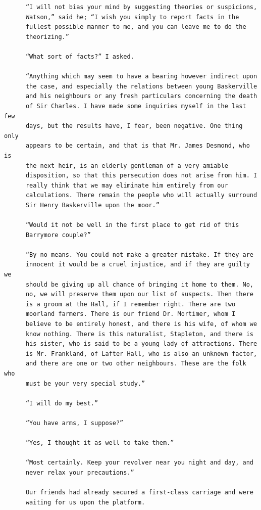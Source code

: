 \documentclass{article}
\begin{document}
\begin{verbatim}
      “I will not bias your mind by suggesting theories or suspicions,
      Watson,” said he; “I wish you simply to report facts in the
      fullest possible manner to me, and you can leave me to do the
      theorizing.”

      “What sort of facts?” I asked.

      “Anything which may seem to have a bearing however indirect upon
      the case, and especially the relations between young Baskerville
      and his neighbours or any fresh particulars concerning the death
      of Sir Charles. I have made some inquiries myself in the last few
      days, but the results have, I fear, been negative. One thing only
      appears to be certain, and that is that Mr. James Desmond, who is
      the next heir, is an elderly gentleman of a very amiable
      disposition, so that this persecution does not arise from him. I
      really think that we may eliminate him entirely from our
      calculations. There remain the people who will actually surround
      Sir Henry Baskerville upon the moor.”

      “Would it not be well in the first place to get rid of this
      Barrymore couple?”

      “By no means. You could not make a greater mistake. If they are
      innocent it would be a cruel injustice, and if they are guilty we
      should be giving up all chance of bringing it home to them. No,
      no, we will preserve them upon our list of suspects. Then there
      is a groom at the Hall, if I remember right. There are two
      moorland farmers. There is our friend Dr. Mortimer, whom I
      believe to be entirely honest, and there is his wife, of whom we
      know nothing. There is this naturalist, Stapleton, and there is
      his sister, who is said to be a young lady of attractions. There
      is Mr. Frankland, of Lafter Hall, who is also an unknown factor,
      and there are one or two other neighbours. These are the folk who
      must be your very special study.”

      “I will do my best.”

      “You have arms, I suppose?”

      “Yes, I thought it as well to take them.”

      “Most certainly. Keep your revolver near you night and day, and
      never relax your precautions.”

      Our friends had already secured a first-class carriage and were
      waiting for us upon the platform.


\end{verbatim}
\end{document}
